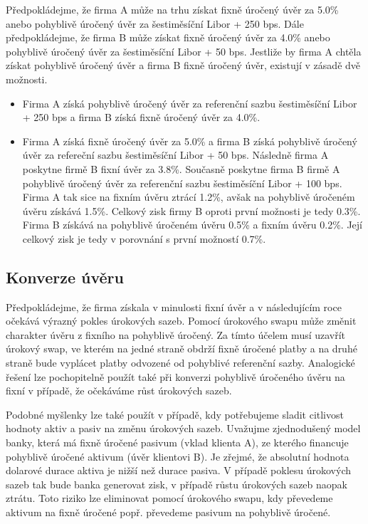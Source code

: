 \documentclass[a4paper]{book}
\begin{document}
Předpokládejme, že firma A může na trhu získat fixně úročený úvěr za 5.0\% anebo pohyblivě úročený úvěr za šestiměsíční Libor + 250 bps. Dále předpokládejme, že firma B může získat fixně úročený úvěr za 4.0\% anebo pohyblivě úročený úvěr za šestiměsíční Libor + 50 bps. Jestliže by firma A chtěla získat pohyblivě úročený úvěr a firma B fixně úročený úvěr, existují v zásadě dvě možnosti.
\begin{itemize}
\item Firma A získá pohyblivě úročený úvěr za referenční sazbu šestiměsíční Libor + 250 bps a firma B získá fixně úročený úvěr za 4.0\%.
\item Firma A získá fixně úročený úvěr za 5.0\% a firma B získá pohyblivě úročený úvěr za refereční sazbu šestiměsíční Libor + 50 bps. Následně firma A poskytne firmě B fixní úvěr za 3.8\%. Současně poskytne firma B firmě A pohyblivě úročený úvěr za referenční sazbu šestiměsíční Libor + 100 bps. Firma A tak sice na fixním úvěru ztrácí 1.2\%, avšak na pohyblivě úročeném úvěru získává 1.5\%. Celkový zisk firmy B oproti první možnosti je tedy 0.3\%. Firma B získává na pohyblivě úročeném úvěru 0.5\% a fixním úvěru 0.2\%. Její celkový zisk je tedy v porovnání s první možností 0.7\%.
\end{itemize}

\subsection{Konverze úvěru}

Předpokládejme, že firma získala v minulosti fixní úvěr a v následujícím roce očekává výrazný pokles úrokových sazeb. Pomocí úrokového swapu může změnit charakter úvěru z fixního na pohyblivě úročený. Za tímto účelem musí uzavřít úrokový swap, ve kterém na jedné straně obdrží fixně úročené platby a na druhé straně bude vyplácet platby odvozené od pohyblivé referenční sazby. Analogické řešení lze pochopitelně použít také při konverzi pohyblivě úročeného úvěru na fixní v případě, že očekáváme růst úrokových sazeb.

Podobné myšlenky lze také použít v případě, kdy potřebujeme sladit citlivost hodnoty aktiv a pasiv na změnu úrokových sazeb. Uvažujme zjednodušený model banky, která má fixně úročené pasivum (vklad klienta A), ze kterého financuje pohyblivě úročené aktivum (úvěr klientovi B). Je zřejmé, že absolutní hodnota dolarové durace aktiva je nižší než durace pasiva. V případě poklesu úrokových sazeb tak bude banka generovat zisk, v případě růstu úrokových sazeb naopak ztrátu. Toto riziko lze eliminovat pomocí úrokového swapu, kdy převedeme aktivum na fixně úročené popř. převedeme pasivum na pohyblivě úročené.  
\end{document}
